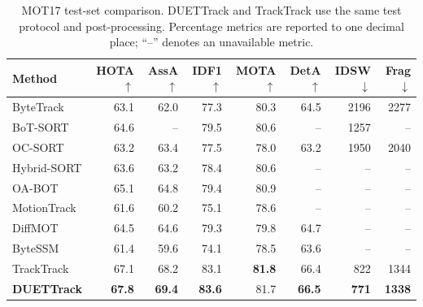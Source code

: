 \documentclass[a4paper,fleqn]{cas-sc}
\begin{document}
\begin{table}[pos=!ht]
\centering
\caption{MOT17 test-set comparison. DUETTrack and TrackTrack use the same test protocol and post-processing. Percentage metrics are reported to one decimal place; ``--'' denotes an unavailable metric.}
\label{tab:mot17}
{\footnotesize
\begin{tabular*}{\textwidth}{@{\extracolsep{\fill}}lrrrrrrr@{}}
\toprule
Method & HOTA$\uparrow$ & AssA$\uparrow$ & IDF1$\uparrow$ & MOTA$\uparrow$ & DetA$\uparrow$ & IDSW$\downarrow$ & Frag$\downarrow$ \\
\midrule
ByteTrack \cite{zhang2022bytetrack} & 63.1 & 62.0 & 77.3 & 80.3 & 64.5 & 2196 & 2277 \\
BoT-SORT \cite{aharon2022bot} & 64.6 & -- & 79.5 & 80.6 & -- & 1257 & -- \\
OC-SORT \cite{cao2023observation} & 63.2 & 63.4 & 77.5 & 78.0 & 63.2 & 1950 & 2040 \\
Hybrid-SORT \cite{yang2024hybrid} & 63.6 & 63.2 & 78.4 & 80.6 & -- & -- & -- \\
OA-BOT \cite{li2026occlusion} & 65.1 & 64.8 & 79.4 & 80.9 & -- & -- & -- \\
MotionTrack \cite{xiao2024motiontrack} & 61.6 & 60.2 & 75.1 & 78.6 & -- & -- & -- \\
DiffMOT \cite{lv2024diffmot} & 64.5 & 64.6 & 79.3 & 79.8 & 64.7 & -- & -- \\
ByteSSM \cite{hu2026trackssm} & 61.4 & 59.6 & 74.1 & 78.5 & 63.6 & -- & -- \\
TrackTrack \cite{shim2025focusing} & 67.1 & 68.2 & 83.1 & \textbf{81.8} & 66.4 & 822 & 1344 \\
\midrule
\textbf{DUETTrack} & \textbf{67.8} & \textbf{69.4} & \textbf{83.6} & 81.7 & \textbf{66.5} & \textbf{771} & \textbf{1338} \\
\bottomrule
\end{tabular*}}
\end{table}
\end{document}
